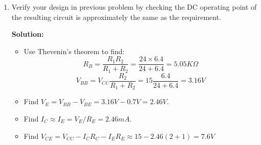 \begin{enumerate}

 {\bf Solution:}
 
 \begin{itemize}
 \item Find $V_{CC}$: for the Q-point to be in the middle of the
   load line, we set $V_{CC}=2V_{CE}=2\times 7.5=15V$.
 \item Find $R_C$ and $R_E$: As $V_{CE}=V_{CC}-I_CR_C-I_ER_E\approx
   V_{CC}-I_C(R_C+R_E)$, we have $R_C+R_E=7.5/2.5\times 10^{-3}=3K\Omega$,
   i.e., $R_E=5K\Omega-R_C=1K\Omega$.
 \item Find desired $V_{BB}$: 
 	\[ V_{BB}=V_{be}+I_ER_E=0.7+2.5\times 10^{-3}\times 10^3=3.2V \]
 \item Find $R_B$: To satisfy $10R_B \le \beta_{min}R_E$, we let 
   $R_B=0.1\times \beta_{min} R_E=0.1\times 50\times 1000=5\;K\Omega$
 \item Find $R_1$ and $R_2$:
 \[	R_B=\frac{R_1R_2}{R_1+R_2}=5\;K\Omega \;\;\;\;\;\;\;\;
       V_{BB}=3.2V=V_{CC}}\frac{R_2}{R_1+R_2}=15 \frac{R_2}{R_1+R_2} \]
 Solve these two equations (first divide the first equation by the second), 
 we obtain the two unknowns $R_1$ and $R_2$:
 \[	R_1=\frac{5\;K\Omega}{0.21}=24\;K\Omega \;\;\;\;\;\;\;\;\;
 	R_2=6.4\; K\Omega	\]

 \end{itemize}

\item Verify your design in previous problem by checking the DC operating
  point of the resulting circuit is approximately the same as the requirement.

{\bf Solution:}
\begin{itemize}
\item Use Thevenin's theorem to find:
  \[ R_B=\frac{R_1 R_2}{R_1+R_2}=\frac{24\times 6.4}{24+6.4}=5.05K\Omega \]
  \[ V_{BB}=V_{CC}\frac{R_2}{R_1+R_2}=15\frac{6.4}{24+6.4}=3.16V \]
\item Find $V_E=V_{BB}-V_{BE}=3.16V-0.7V=2.46V$.
\item Find $I_C \approx I_E=V_E/R_E=2.46 mA$.
\item Find $V_{CE}=V_{CC}-I_C R_C-I_E R_E\approx 15-2.46(2+1)=7.6V$
\end{itemize}

\end{enumerate}




